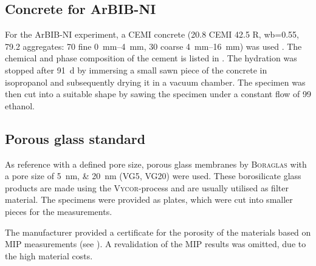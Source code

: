 \FloatBarrier
\subsection{Concrete for \ac{ArBIB}-\ac{NI}}
\label{sec:ni_concrete}

For the \ac{ArBIB}-\ac{NI} experiment, a \acs{CEMI} concrete (\qty{20.8}{\wtpercent} \acs{CEMI} \num{42.5} R, \ac{wb}=\num{0.55}, \qty{79,2}{\wtpercent} aggregates: \qty{70}{\volpercent} fine \qtyrange{0}{4}{\milli\meter}, \qty{30}{\volpercent} coarse \qtyrange{4}{16}{\milli\meter}) was used \cite{li.2026}.
The chemical and phase composition of the cement is listed in .
The hydration was stopped after \qty{91}{\day} by immersing a small sawn piece of the concrete in isopropanol and subsequently drying it in a vacuum chamber.
The specimen was then cut into a suitable shape by sawing the specimen under a constant flow of \qty{99}{\volpercent} ethanol.

\FloatBarrier
\subsection{Porous glass standard}
\label{sec:boraglas}

As reference  with a defined pore size, porous glass membranes by \textsc{Boraglas} with a pore size of \qtylist{5;20}{\nano\meter} (\ac{VG5}, \ac{VG20}) were used.
These borosilicate glass products are made using the \textsc{Vycor}-process and are usually utilised as filter material.
The specimens were provided as  plates, which were cut into smaller pieces for the measurements.

The manufacturer provided a certificate for the porosity of the materials based on \ac{MIP} measurements (see ).
A revalidation of the \ac{MIP} results was omitted, due to the high material costs.


